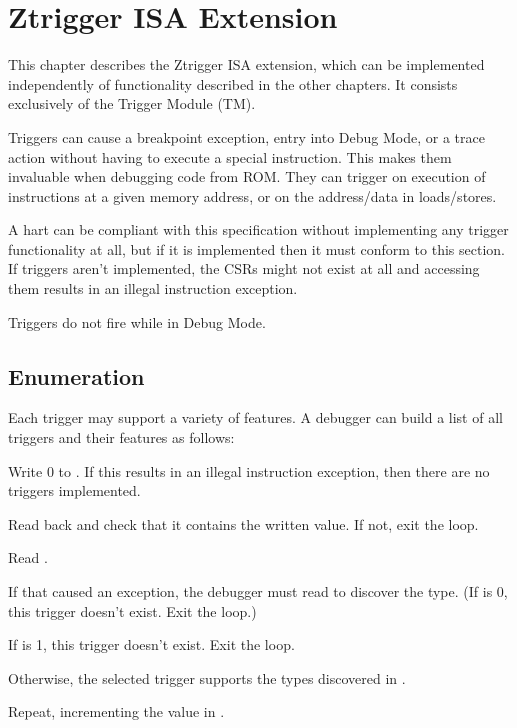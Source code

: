 \chapter{Ztrigger ISA Extension}
\label{sec:trigger}

This chapter describes the Ztrigger ISA extension, which can be implemented
independently of functionality described in the other chapters. It consists
exclusively of the Trigger Module (TM).

Triggers can cause a breakpoint exception, entry into Debug Mode, or a trace action
without having to execute a special instruction. This makes them invaluable
when debugging code from ROM. They can trigger on execution of instructions at
a given memory address, or on the address/data in loads/stores.

A hart can be compliant with this specification without implementing any
trigger functionality at all, but if it is implemented then it must conform to
this section. If triggers aren't implemented, the CSRs might not exist at all and
accessing them results in an illegal instruction exception.

Triggers do not fire while in Debug Mode.

\section{Enumeration}

\begin{steps}{Each trigger may support a variety of features. A debugger can
    build a list of all triggers and their features as follows:}
\item Write 0 to \RcsrTselect. If this results in an illegal instruction
    exception, then there are no triggers implemented.
\item Read back \RcsrTselect and check that it contains the written value. If not,
    exit the loop.
\item Read \RcsrTinfo.
\item If that caused an exception, the debugger must read \RcsrTdataOne to
    discover the type. (If \FcsrTdataOneType is 0, this trigger doesn't exist. Exit the
    loop.)
\item If \FcsrTinfoInfo is 1, this trigger doesn't exist. Exit the loop.
\item Otherwise, the selected trigger supports the types discovered in \FcsrTinfoInfo.
\item Repeat, incrementing the value in \RcsrTselect.
\end{steps}

